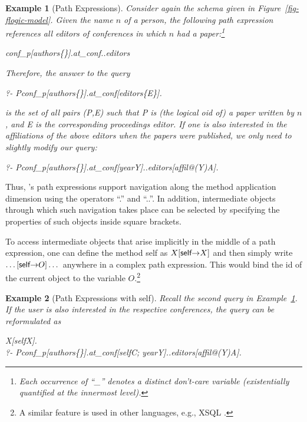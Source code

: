 \documentclass[11pt]{report}
\newtheorem{example}{Example}[section]
\begin{document}
\begin{example}[Path Expressions]\label{Ex:PathExpr}
  \rm
  Consider again the schema given in Figure~\ref{fig-flogic-model}.
  Given the name $n$ of a person, the following path expression
  references all editors of conferences in which $n$ had a
  paper:\footnote{Each occurrence of ``\_'' denotes a distinct
    don't-care variable (existentially quantified at the
    innermost level).}
\begin{qrules}
  \anon\isa conf\_p[authors\mvd\{\anon [name\fd $n$]\}].at\_conf..editors
\end{qrules}
Therefore, the answer to the \emph{query}
\begin{qrules}
  ?- P\isa conf\_p[authors\mvd\{\anon [name\fd
  $n$]\}].at\_conf[editors\mvd\{E\}].
\end{qrules}
is the set of all pairs (\textsf{P},\textsf{E}) such that \textsf{P}
is (the logical oid of) a paper written by $n$, and \textsf{E} is the
corresponding proceedings editor.  If one is also interested in the
affiliations of the above editors when the papers were published, we only
need to slightly modify our query:
\begin{qrules}
  ?- P\isa conf\_p[authors\mvd\{\anon [name\fd
  $n$]\}].at\_conf[year\fd Y]..editors[affil@(Y)\fd A].
\end{qrules}
\end{example}
Thus, \FLORA's path expressions support navigation 
along the method application dimension using the operators
``.''  and
``..''. In addition, intermediate objects through which such navigation
takes place can be selected by specifying the properties of such objects
inside square brackets.

To access intermediate objects that arise implicitly in the middle
of a path expression, one can define the method \textsf{self} as
$X[\textsf{self}{\rightarrow} X]$ and then simply
write $\dots[\textsf{self}{\rightarrow} O]\dots$ anywhere in a complex
path expression. This would bind the id of the current object to the
variable $O$.\footnote{
  A similar feature is used in other
  languages, e.g., XSQL \cite{xsql-92}.
  }

\begin{example}[Path Expressions with \textsf{self}]\label{ex-path-self}
  \rm
  Recall the second query in Example~\ref{Ex:PathExpr}. If the user is
  also interested in the respective conferences, the query can be
  reformulated as
\begin{qrules}
  X[self\fd X].\\
   ?- P\isa conf\_p[authors\mvd\{\anon [name\fd
   $n$]\}].at\_conf[self\fd C; year\fd Y]..editors[affil@(Y)\fd A]. 
\end{qrules}
\end{example}
\end{document}

